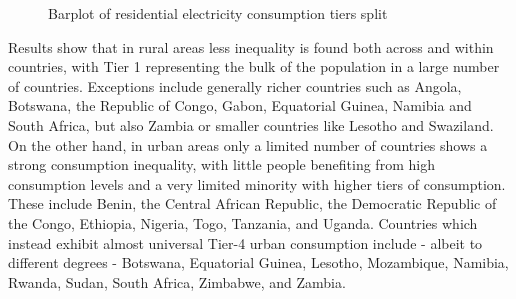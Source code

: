 \documentclass[preprint,12pt]{elsarticle}
\begin{document}
\begin{figure}[H]
    \label{residential_consumption_inequality}
    \centering
    \qquad
    \caption{Barplot of residential electricity consumption tiers split}
\end{figure}

Results show that in rural areas less inequality is found both across and within countries, with Tier 1 representing the bulk of the population in a large number of countries. Exceptions include generally richer countries such as Angola, Botswana, the Republic of Congo, Gabon, Equatorial Guinea, Namibia and South Africa, but also Zambia  or smaller countries like Lesotho and Swaziland. On the other hand, in urban areas only a limited number of countries shows a strong consumption inequality, with little people benefiting from high consumption levels and a very limited minority with higher tiers of consumption. These include Benin, the Central African Republic, the Democratic Republic of the Congo, Ethiopia, Nigeria, Togo, Tanzania, and Uganda. Countries which instead exhibit almost universal Tier-4 urban consumption include - albeit to different degrees - Botswana, Equatorial Guinea, Lesotho, Mozambique, Namibia, Rwanda, Sudan, South Africa, Zimbabwe, and Zambia. 
\end{document}
